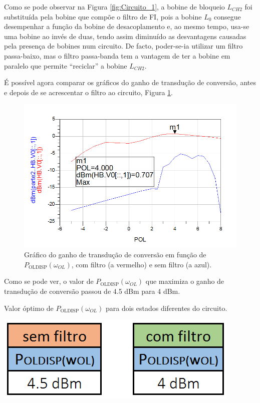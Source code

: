\documentclass[11pt]{article}
\numberwithin{equation}{section}
\begin{document}
Como se pode observar na Figura \ref{fig:Circuito_1}, a bobine de bloqueio $L_{CH2}$ foi substituída pela bobine que compõe o filtro de FI, pois a bobine $ L_{0} $ consegue desempenhar a função da bobine de desacoplamento e, ao mesmo tempo, usa-se uma bobine ao invés de duas, tendo assim diminuído as desvantagens causadas pela presença de bobines num circuito. De facto, poder-se-ia utilizar um filtro passa-baixo, mas o filtro passa-banda tem a vantagem de ter a bobine em paralelo que permite ``reciclar'' a bobine $L_{CH2}$.

É possível agora comparar os gráficos do ganho de transdução de conversão, antes e depois de se acrescentar o filtro ao circuito, Figura \ref{fig:GT_1}.

\begin{figure}[h]
\centering
\includegraphics[keepaspectratio=true, scale=0.45]{exps/GT_1}
\vspace{-0.5em}
\caption{Gráfico do ganho de transdução de conversão em função de $ P_{\text{OLDISP}}\left(\omega_{OL}\right) $, com filtro (a vermelho) e sem filtro (a azul).}
\vspace{-0.8em}
\label{fig:GT_1}
\end{figure}

Como se pode ver, o valor de $ P_{\text{OLDISP}}\left(\omega_{OL}\right) $ que maximiza o ganho de transdução de conversão passou de 4.5 dBm para 4 dBm.

\begin{table}[h]
	\centering
	\caption{Valor óptimo de $ P_{\text{OLDISP}}\left(\omega_{OL}\right) $ para dois estados diferentes do circuito.}
	\vspace{-1.5mm}
	\includegraphics[keepaspectratio=true, scale=0.45]{teoricas/poldispSemComFiltro}
\end{table}
\end{document}
